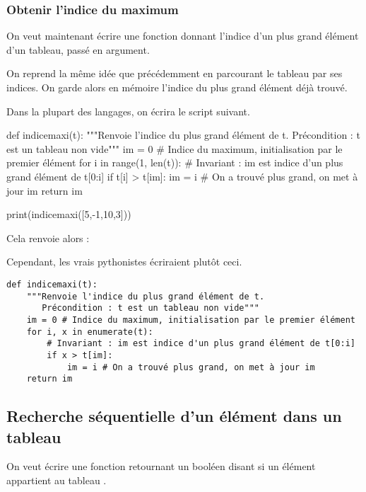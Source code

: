 \subsubsection{Obtenir l'indice du maximum}
On veut maintenant écrire une fonction  donnant l'indice d'un plus grand élément d'un tableau, passé en argument.

On reprend la même idée que précédemment en parcourant le tableau par ses indices. On garde alors 
en mémoire l'indice du plus grand élément déjà trouvé.

Dans la plupart des langages, on écrira le script suivant.
\begin{pyblock}
def indicemaxi(t):
    """Renvoie l'indice du plus grand élément de t.
       Précondition : t est un tableau non vide"""
    im = 0 # Indice du maximum, initialisation par le premier élément
    for i in range(1, len(t)):
        # Invariant : im est indice d'un plus grand élément de t[0:i]
        if t[i] > t[im]:
            im = i # On a trouvé plus grand, on met à jour im
    return im
    
print(indicemaxi([5,-1,10,3]))
\end{pyblock}

Cela renvoie alors :
\begin{quote}
  \printpythontex[verb]
\end{quote}

Cependant, les vrais pythonistes écriraient plutôt ceci. 
\begin{lstlisting}
def indicemaxi(t):
    """Renvoie l'indice du plus grand élément de t.
       Précondition : t est un tableau non vide"""
    im = 0 # Indice du maximum, initialisation par le premier élément
    for i, x in enumerate(t):
        # Invariant : im est indice d'un plus grand élément de t[0:i]
        if x > t[im]:
            im = i # On a trouvé plus grand, on met à jour im
    return im
\end{lstlisting}

\subsection{Recherche séquentielle d'un élément dans un tableau}

On veut écrire une fonction  retournant un booléen disant si un
élément  appartient au tableau . 

